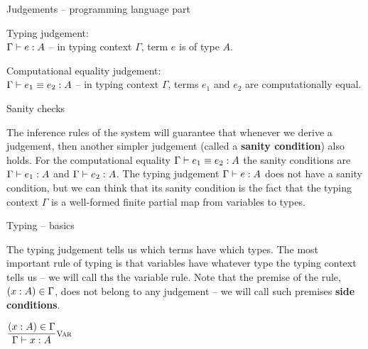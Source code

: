 \documentclass{beamer}
\begin{document}
\begin{frame}{Judgements -- programming language part}

Typing judgement: \\
$\typing{e}{A}$ -- in typing context $\Gamma$, term $e$ is of type $A$.

\vspace{2em}

Computational equality judgement: \\
$\compeq{e_1}{e_2}{A}$ -- in typing context $\Gamma$, terms $e_1$ and $e_2$ are computationally equal.

\end{frame}

\begin{frame}{Sanity checks}

The inference rules of the system will guarantee that whenever we derive a judgement, then another simpler judgement (called a \textbf{sanity condition}) also holds. For the computational equality $\compeq{e_1}{e_2}{A}$ the sanity conditions are $\typing{e_1}{A}$ and $\typing{e_2}{A}$. The typing judgement $\typing{e}{A}$ does not have a sanity condition, but we can think that its sanity condition is the fact that the typing context $\Gamma$ is a well-formed finite partial map from variables to types.

\end{frame}

\begin{frame}{Typing -- basics}

The typing judgement tells us which terms have which types. The most important rule of typing is that variables have whatever type the typing context tells us -- we will call ths the variable rule. Note that the premise of the rule, $(x : A) \in \Gamma$, does not belong to any judgement -- we will call such premises \textbf{side conditions}.

\vspace{2em}

\begin{center}
  $\infrule[Var]{\sidecond{(x : A) \in \Gamma}}{\typing{x}{A}}$
\end{center}

\end{frame}
\end{document}
